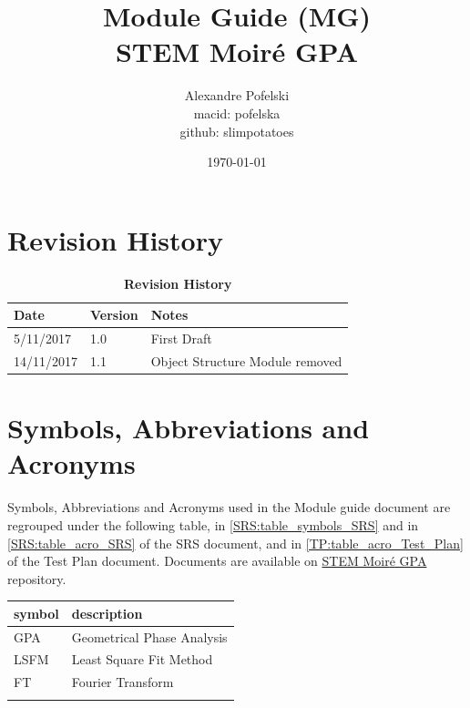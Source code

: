 \documentclass[12pt, titlepage]{article}
\newcommand{\progname}{STEM Moir{\'e} GPA}
\begin{document}
\title{Module Guide (MG) \\
STEM Moir{\'e} GPA} 
\author{Alexandre Pofelski \\
		macid: pofelska \\
		github: slimpotatoes}
\date{\today}

\maketitle


\section{Revision History}

\begin{table}[h]
\caption{\bf Revision History}
\begin{tabularx}{\textwidth}{p{3cm}p{2cm}X}
\toprule {\bf Date} & {\bf Version} & {\bf Notes}\\
\midrule
5/11/2017 & 1.0 & First Draft\\
14/11/2017 & 1.1 & Object Structure Module removed \\
\bottomrule
\end{tabularx}
\end{table}

\newpage
\section{Symbols, Abbreviations and Acronyms}
\label{symbols}

Symbols, Abbreviations and Acronyms used in the Module guide document are regrouped under the following table, in \cref{SRS:table_symbols_SRS} and in \cref{SRS:table_acro_SRS} of the SRS document, and in \cref{TP:table_acro_Test_Plan} of the Test Plan document. Documents are available on \href{https://github.com/slimpotatoes/STEM_Moire_GPA}{\progname{}} repository. \par\bigskip

\renewcommand{\arraystretch}{1.2}
\begin{tabular}{l l} 
  \toprule		
  \textbf{symbol} & \textbf{description}\\
  \midrule 
  GPA & Geometrical Phase Analysis \\
  LSFM & Least Square Fit Method \\
  FT & Fourier Transform \\
  \bottomrule
  \label{table_acro_Test_Plan}
\end{tabular}
\end{document}
